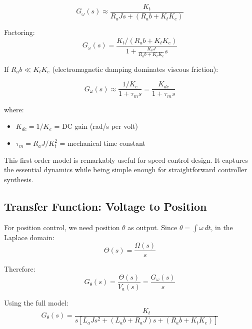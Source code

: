 \begin{equation}
    G_\omega(s) \approx \frac{K_t}{R_a J s + (R_a b + K_t K_e)}
\end{equation}

Factoring:
\begin{equation}
    G_\omega(s) = \frac{K_t/(R_a b + K_t K_e)}{1 + \frac{R_a J}{R_a b + K_t K_e} s}
\end{equation}

If $R_a b \ll K_t K_e$ (electromagnetic damping dominates viscous friction):

\begin{equation}
    \boxed{G_\omega(s) \approx \frac{1/K_e}{1 + \tau_m s} = \frac{K_{dc}}{1 + \tau_m s}}
    \label{eq:motor_tf_simplified}
\end{equation}

where:
\begin{itemize}
    \item $K_{dc} = 1/K_e$ = DC gain (rad/s per volt)
    \item $\tau_m = R_a J / K_t^2$ = mechanical time constant
\end{itemize}

This first-order model is remarkably useful for speed control design. It captures the essential dynamics while being simple enough for straightforward controller synthesis.


\subsection{Transfer Function: Voltage to Position}

For position control, we need position $\theta$ as output. Since $\theta = \int \omega \, dt$, in the Laplace domain:
\begin{equation}
    \Theta(s) = \frac{\Omega(s)}{s}
\end{equation}

Therefore:
\begin{equation}
    G_\theta(s) = \frac{\Theta(s)}{V_a(s)} = \frac{G_\omega(s)}{s}
\end{equation}

Using the full model:
\begin{equation}
    \boxed{G_\theta(s) = \frac{K_t}{s[L_a J s^2 + (L_a b + R_a J) s + (R_a b + K_t K_e)]}}
    \label{eq:motor_tf_position_full}
\end{equation}

